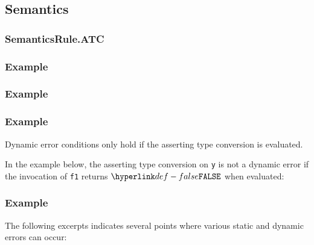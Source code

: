 \begin{mathpar}
\end{mathpar}

\subsection{Semantics}
\subsubsection{SemanticsRule.ATC \label{sec:SemanticsRule.ATC}}
\subsubsection{Example}

\subsubsection{Example}

\subsubsection{Example}

Dynamic error conditions only hold if the asserting type conversion is
evaluated.

In the example below, the asserting type conversion on \texttt{y} is
not a dynamic error if the invocation of \texttt{f1} returns $\False$ when
evaluated:

\subsubsection{Example}
The following excerpts indicates several points where various static and
dynamic errors can occur:

